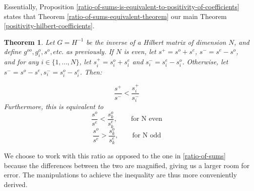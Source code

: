 \documentclass{article}
\newtheorem{thm}{Theorem}[section]
\theoremstyle{definition}
\theoremstyle{remark}
\numberwithin{equation}{section}
\begin{document}
Essentially, Proposition \ref{ratio-of-sums-is-equivalent-to-positivity-of-coefficients} states that Theorem \ref{ratio-of-sums-equivalent-theorem} our main Theorem \ref{positivity-hilbert-coefficients}.

\begin{thm}\label{ratio-of-absolute-difference-theorem}
Let $G=H^{-1}$ be the inverse of a Hilbert matrix of dimension $N$, and define $g^{oo}, g_i^o, s^o, etc.$ as previously. If $N$ is even, let $s^+ = s^o + s^e$, $s^- = s^e-s^o$, and for any $i\in \{1,...,N\}$, let $s_i^+ = s_i^o + s_i^e$ and $s_i^- = s_i^e- s_i^o$. Otherwise, let $s^- = s^o - s^e, s_i^- = s_i^o - s_i^e$. Then:

\begin{equation}\label{ratio-of-absolute-difference-inequality}
\frac{s^+}{s^-} < \frac{s_i^+}{s_i^-} 
\end{equation} Furthermore, this is equivalent to 
\[ \frac{s^o}{s^e} < \frac{s^o_k}{s^e_k}, \qquad \text{for N even} \]
\[ \frac{s^o}{s^e} > \frac{s^o_k}{s^e_k}, \qquad \text{for N odd} \]
\end{thm}  We choose to work with this ratio as opposed to the one in \ref{ratio-of-sums} because the differences between the two are magnified, giving us a larger room for error. The manipulations to achieve the inequality are thus more conveniently derived. 
\end{document}
